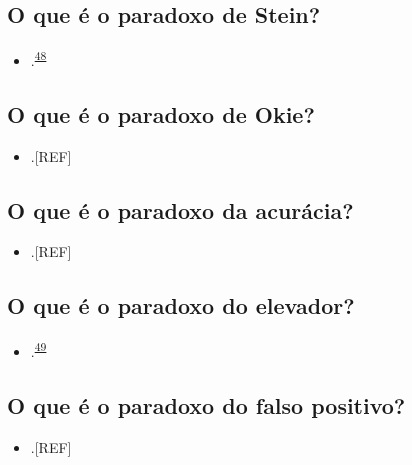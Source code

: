 \documentclass[
  a4paper,
]{book}
\providecommand{\tightlist}{%
  \setlength{\itemsep}{0pt}\setlength{\parskip}{0pt}}
\begin{document}
\hypertarget{stein}{%
\subsection{O que é o paradoxo de Stein?}\label{stein}}

\begin{itemize}
\tightlist
\item
  .\textsuperscript{\protect\hyperlink{ref-stein1956}{48}}
\end{itemize}

\hypertarget{okie}{%
\subsection{O que é o paradoxo de Okie?}\label{okie}}

\begin{itemize}
\tightlist
\item
  .{[}REF{]}
\end{itemize}

\hypertarget{acuracia}{%
\subsection{O que é o paradoxo da acurácia?}\label{acuracia}}

\begin{itemize}
\tightlist
\item
  .{[}REF{]}
\end{itemize}

\hypertarget{elevador}{%
\subsection{O que é o paradoxo do elevador?}\label{elevador}}

\begin{itemize}
\tightlist
\item
  .\textsuperscript{\protect\hyperlink{ref-de1996}{49}}
\end{itemize}

\hypertarget{falso-positivo}{%
\subsection{O que é o paradoxo do falso positivo?}\label{falso-positivo}}

\begin{itemize}
\tightlist
\item
  .{[}REF{]}
\end{itemize}
\end{document}
